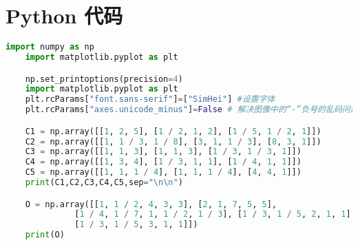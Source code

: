 \documentclass[withoutpreface]{cumcmthesis}
\begin{document}
    \section{Python 代码}

    \begin{lstlisting}[language=python,caption={初始化}]
    import numpy as np
    import matplotlib.pyplot as plt

    np.set_printoptions(precision=4)
    import matplotlib.pyplot as plt
    plt.rcParams["font.sans-serif"]=["SimHei"] #设置字体
    plt.rcParams["axes.unicode_minus"]=False # 解决图像中的“-”负号的乱码问题

    C1 = np.array([[1, 2, 5], [1 / 2, 1, 2], [1 / 5, 1 / 2, 1]])
    C2 = np.array([[1, 1 / 3, 1 / 8], [3, 1, 1 / 3], [8, 3, 1]])
    C3 = np.array([[1, 1, 3], [1, 1, 3], [1 / 3, 1 / 3, 1]])
    C4 = np.array([[1, 3, 4], [1 / 3, 1, 1], [1 / 4, 1, 1]])
    C5 = np.array([[1, 1, 1 / 4], [1, 1, 1 / 4], [4, 4, 1]])
    print(C1,C2,C3,C4,C5,sep="\n\n")

    O = np.array([[1, 1 / 2, 4, 3, 3], [2, 1, 7, 5, 5],
              [1 / 4, 1 / 7, 1, 1 / 2, 1 / 3], [1 / 3, 1 / 5, 2, 1, 1],
              [1 / 3, 1 / 5, 3, 1, 1]])
    print(O)
    \end{lstlisting}
\end{document}
